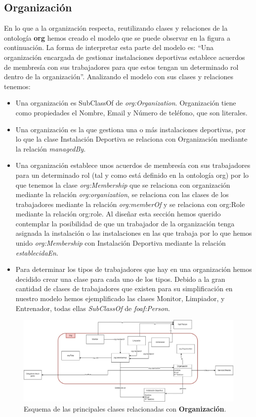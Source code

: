 \documentclass[a4paper,12pt]{article}
\begin{document}
	\subsection{Organización}
	
	En lo que a la organización respecta, reutilizando clases y relaciones de la ontología \textbf{org} hemos
creado el modelo que se puede observar en la figura a continuación. La forma de interpretar esta parte del
modelo es: “Una organización encargada de gestionar instalaciones deportivas establece acuerdos
de membresía con sus trabajadores para que estos tengan un determinado rol dentro de la
organización”. Analizando el modelo con sus clases y relaciones tenemos:
	
	\begin{itemize}
		\item Una organización es SubClassOf de \textit{org:Organization}. Organización tiene como
propiedades el Nombre, Email y Número de teléfono, que son literales.
		\item Una organización es la que gestiona una o más instalaciones deportivas, por lo que la
clase Instalación Deportiva se relaciona con Organización mediante la relación
\textit{managedBy}.
		\item Una organización establece unos acuerdos de membresía con sus trabajadores para un
determinado rol (tal y como está definido en la ontología org) por lo que tenemos la clase
\textit{org:Membership} que se relaciona con organización mediante la relación
\textit{org:organization}, se relaciona con las clases de los trabajadores mediante la relación
\textit{org:memberOf} y se relaciona con org:Role mediante la relación org:role. Al diseñar esta
sección hemos querido contemplar la posibilidad de que un trabajador de la organización
tenga asignada la instalación o las instalaciones en las que trabaja por lo que hemos unido
\textit{org:Membership} con Instalación Deportiva mediante la relación \textit{establecidaEn}.
		\item Para determinar los tipos de trabajadores que hay en una organización hemos decidido
crear una clase para cada uno de los tipos. Debido a la gran cantidad de clases de
trabajadores que existen para su simplificación en nuestro modelo hemos ejemplificado
las clases Monitor, Limpiador, y Entrenador, todas ellas \textit{SubClassOf} de \textit{foaf:Person}.
	\end{itemize}

	\begin{figure}[H]
		\centering
		\includegraphics[width=\textwidth]{include/org.jpg}
		\caption{Esquema de las principales clases relacionadas con \textbf{Organización}.}
	\end{figure}
	
\end{document}
